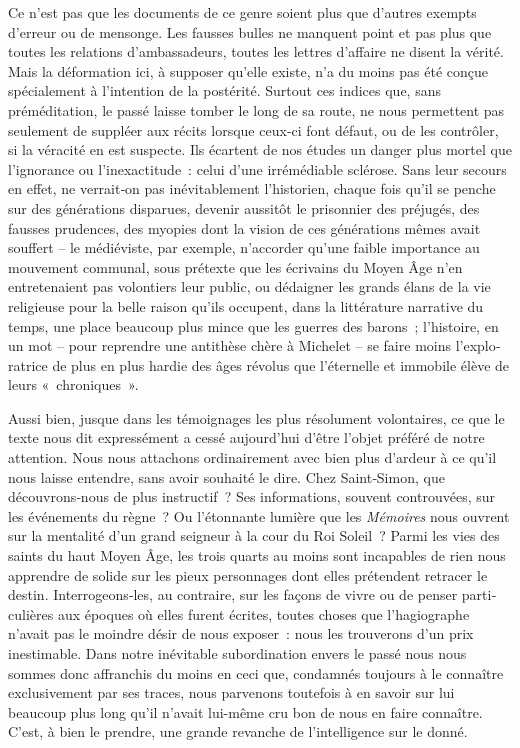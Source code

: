 \documentclass[french,twoside]{book} %
\begin{document}
\noindent  {}
\label{p25} Ce n’est pas que les documents de ce genre soient plus que d’autres exempts d’erreur ou de mensonge. Les fausses bulles ne manquent point et pas plus que toutes les relations d’ambassadeurs, toutes les lettres d’affaire ne disent la vérité. Mais la déformation ici, à supposer qu’elle existe, n’a du moins pas été conçue spécialement à l’intention de la posté­rité. Surtout ces indices que, sans préméditation, le passé laisse tomber le long de sa route, ne nous permettent pas seulement de suppléer aux récits lorsque ceux‑ci font défaut, ou de les contrôler, si la véracité en est suspecte. Ils écartent de nos études un danger plus mortel que l’igno­rance ou l’inexactitude : celui d’une irrémédiable sclérose. Sans leur secours en effet, ne verrait‑on pas inévitablement l’historien, chaque fois qu’il se penche sur des générations disparues, devenir aussitôt le prison­nier des préjugés, des fausses prudences, des myopies dont la vision de ces générations mêmes avait souffert – le médiéviste, par exemple, n’accorder qu’une faible importance au mouvement communal, sous pré­texte que les écrivains du Moyen Âge n’en entretenaient pas volontiers leur public, ou dédaigner les grands élans de la vie religieuse pour la belle raison qu’ils occupent, dans la littérature narrative du temps, une place beaucoup plus mince que les guerres des barons ; l’histoire, en un mot – pour reprendre une antithèse chère à Michelet – se faire moins l’explo­ratrice de plus en plus hardie des âges révolus que l’éternelle et immobile élève de leurs « chroniques ».\par
Aussi bien, jusque dans les témoignages les plus résolument volontaires, ce que le texte nous dit expressément a cessé aujourd’hui d’être l’objet préféré de notre attention. Nous nous attachons ordinairement avec bien plus d’ardeur à ce qu’il nous laisse entendre, sans avoir souhaité le dire. Chez Saint‑Simon, que découvrons‑nous de plus instructif ? Ses infor­mations, souvent controuvées, sur les événements du règne ? Ou l’éton­nante lumière que les \emph{Mémoires} nous ouvrent sur la mentalité d’un grand seigneur à la cour du Roi Soleil ? Parmi les vies des saints du haut Moyen Âge, les trois quarts au moins sont incapables de rien nous apprendre de solide sur les pieux personnages dont elles prétendent retracer le destin. Interrogeons‑les, au contraire, sur les façons de vivre ou de penser parti­culières aux époques où elles furent écrites, toutes choses que l’hagiographe n’avait pas le moindre désir de nous exposer : nous les trouverons d’un prix inestimable. Dans notre inévitable subordination envers le passé nous nous sommes donc affranchis du moins en ceci que, condamnés toujours à le connaître exclusivement par ses traces, nous parvenons toutefois à en savoir sur lui beaucoup plus long qu’il n’avait lui-même cru bon de nous en faire connaître. C’est, à bien le prendre, une grande revanche de l’intelligence sur le donné.\par
\end{document}
